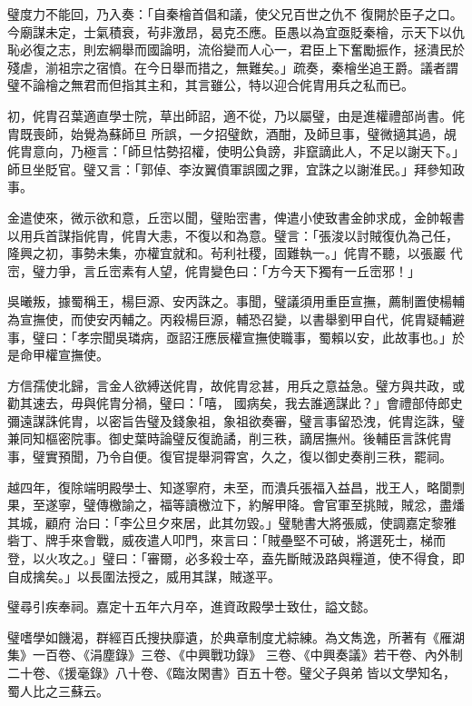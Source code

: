 \begin{pinyinscope}
 璧度力不能回，乃入奏：「自秦檜首倡和議，使父兄百世之仇不
 復開於臣子之口。今廟謀未定，士氣積衰，茍非激昂，曷克丕應。臣愚以為宜亟貶秦檜，示天下以仇恥必復之志，則宏綱舉而國論明，流俗變而人心一，君臣上下奮勵振作，拯潰民於殘虐，湔祖宗之宿憤。在今日舉而措之，無難矣。」疏奏，秦檜坐追王爵。議者謂璧不論檜之無君而但指其主和，其言雖公，特以迎合侂胄用兵之私而已。



 初，侂胄召葉適直學士院，草出師詔，適不從，乃以屬璧，由是進權禮部尚書。侂胄既喪師，始覺為蘇師旦
 所誤，一夕招璧飲，酒酣，及師旦事，璧微擿其過，覘侂胄意向，乃極言：「師旦怙勢招權，使明公負謗，非竄謫此人，不足以謝天下。」師旦坐貶官。璧又言：「郭倬、李汝翼僨軍誤國之罪，宜誅之以謝淮民。」拜參知政事。



 金遣使來，微示欲和意，丘崈以聞，璧貽崈書，俾遣小使致書金帥求成，金帥報書以用兵首謀指侂胄，侂胄大恚，不復以和為意。璧言：「張浚以討賊復仇為己任，隆興之初，事勢未集，亦權宜就和。茍利社稷，固難執一。」侂胄不聽，以張巖
 代崈，璧力爭，言丘崈素有人望，侂胄變色曰：「方今天下獨有一丘崈邪！」



 吳曦叛，據蜀稱王，楊巨源、安丙誅之。事聞，璧議須用重臣宣撫，薦制置使楊輔為宣撫使，而使安丙輔之。丙殺楊巨源，輔恐召變，以書舉劉甲自代，侂胄疑輔避事，璧曰：「孝宗聞吳璘病，亟詔汪應辰權宣撫使職事，蜀賴以安，此故事也。」於是命甲權宣撫使。



 方信孺使北歸，言金人欲縛送侂胄，故侂胄忿甚，用兵之意益急。璧方與共政，或勸其速去，毋與侂胄分禍，璧曰：「嘻，
 國病矣，我去誰適謀此？」會禮部侍郎史彌遠謀誅侂胄，以密旨告璧及錢象祖，象祖欲奏審，璧言事留恐洩，侂胄迄誅，璧兼同知樞密院事。御史葉時論璧反復詭譎，削三秩，謫居撫州。後輔臣言誅侂胄事，璧實預聞，乃令自便。復官提舉洞霄宮，久之，復以御史奏削三秩，罷祠。



 越四年，復除端明殿學士、知遂寧府，未至，而潰兵張福入益昌，戕王人，略閬剽果，至遂寧，璧傳檄諭之，福等讀檄泣下，約解甲降。會官軍至挑賊，賊忿，盡燔其城，顧府
 治曰：「李公旦夕來居，此其勿毀。」璧馳書大將張威，使調嘉定黎雅砦丁、牌手來會戰，威夜遣人叩門，來言曰：「賊壘堅不可破，將選死士，梯而登，以火攻之。」璧曰：「審爾，必多殺士卒，盍先斷賊汲路與糧道，使不得食，即自成擒矣。」以長圍法授之，威用其謀，賊遂平。



 璧尋引疾奉祠。嘉定十五年六月卒，進資政殿學士致仕，謚文懿。



 璧嗜學如饑渴，群經百氏搜抉靡遺，於典章制度尤綜練。為文雋逸，所著有《雁湖集》一百卷、《涓塵錄》三卷、《中興戰功錄》
 三卷、《中興奏議》若干卷、內外制二十卷、《援毫錄》八十卷、《臨汝閑書》百五十卷。璧父子與弟𡌴皆以文學知名，蜀人比之三蘇云。




\end{pinyinscope}

